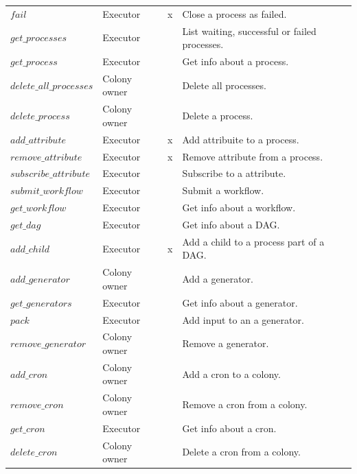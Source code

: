 \documentclass{article}
\begin{document}
\begin{table}[h]
\begin{tabular}{llcl}
        \(fail\)                   & Executor     & x          & Close a process as failed. \\
        \(get\_processes\)         & Executor     &            & List waiting, successful or failed processes. \\
        \(get\_process\)           & Executor     &            & Get info about a process. \\
        \(delete\_all\_processes\) & Colony owner &            & Delete all processes. \\
        \(delete\_process\)        & Colony owner &            & Delete a process. \\
        \(add\_attribute\)         & Executor     & x          & Add attribuite to a process. \\
        \(remove\_attribute\)      & Executor     & x          & Remove attribute from a process. \\
        \(subscribe\_attribute\)   & Executor     &            & Subscribe to a attribute. \\
        \(submit\_workflow\)       & Executor     &            & Submit a workflow. \\
        \(get\_workflow\)          & Executor     &            & Get info about a workflow. \\
        \(get\_dag\)               & Executor     &            & Get info about a DAG. \\
        \(add\_child\)             & Executor     & x          & Add a child to a process part of a DAG. \\
        \(add\_generator\)         & Colony owner &            & Add a generator. \\
        \(get\_generators\)        & Executor     &            & Get info about a generator. \\
        \(pack\)                   & Executor     &            & Add input to an a generator. \\
        \(remove\_generator\)      & Colony owner &            & Remove a generator. \\
        \(add\_cron\)              & Colony owner &            & Add a cron to a colony.\\
        \(remove\_cron\)           & Colony owner &            & Remove a cron from a colony.\\
        \(get\_cron\)              & Executor     &            & Get info about a cron. \\
        \(delete\_cron\)           & Colony owner &            & Delete a cron from a colony.\\

\end{tabular}
\end{table}
\end{document}
